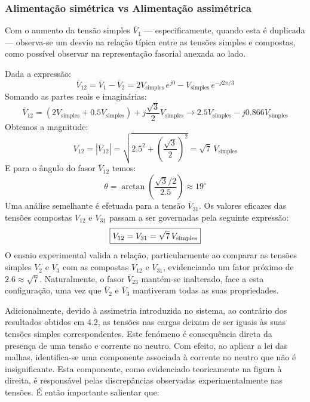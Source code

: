 \clearpage
\subsubsection*{Alimentação simétrica vs Alimentação assimétrica}

Com o aumento da tensão simples $\overline{V}_{1}$ --– especificamente, quando esta é duplicada --- observa-se um desvio na relação típica entre as tensões simples e compostas, como possível observar na representação fasorial anexada ao lado. 

\noindent Dada a expressão:
$$
    \overline{V}_{12} = \overline{V}_{1} - \overline{V}_{2} = 2V_\text{simples}\, e^{j0} - V_\text{simples}\, e^{-j2\pi/3} 
$$
\noindent Somando as partes reais e imaginárias:
$$
	\overline{V}_{12} = (2V_\text{simples} + 0.5V_\text{simples}) + j\frac{\sqrt{3}}{2} V_\text{simples} \rightarrow \boxed{2.5V_\text{simples} - j0.866V_\text{simples}}
$$
\noindent Obtemos a magnitude:
$$
	V_{12} = |\overline{V}_{12}| = \sqrt{2.5^2 + \left(\frac{\sqrt{3}}{2}\right)^2} = \sqrt{7}\, V_\text{simples}
$$
\noindent E para o ângulo do fasor $\overline{V}_{12}$ temos:
$$
	\theta = \arctan\left(\frac{\sqrt{3}/2}{2.5}\right) \approx 19^{\circ}
$$
\noindent Uma análise semelhante é efetuada para a tensão $\overline{V}_{31}$. Os valores eficazes das tensões compostas $V_{12}$ e $V_{31}$ passam a ser governadas pela seguinte expressão:
$$
    \boxed{%
        V_{12} = V_{31} = \sqrt{7}\, V_\text{simples}
    }
$$
\noindent O ensaio experimental valida a relação, particularmente ao comparar as tensões simples $V_2$ e $V_3$ com as compostas $V_{12}$ e $V_{31}$, evidenciando um fator próximo de $2.6 \approx \sqrt{7}$. Naturalmente, o fasor $\overline{V}_{23}$ mantém-se inalterado, face a esta configuração, uma vez que $\overline{V}_2$ e $\overline{V}_3$ mantiveram todas as suas propriedades.

\noindent Adicionalmente, devido à assimetria introduzida no sistema, ao contrário dos resultados obtidos em 4.2, as tensões nas cargas deixam de ser iguais às suas tensões simples correspondentes. Este fenómeno é consequência direta da presença de uma tensão e corrente no neutro. Com efeito, ao aplicar a lei das malhas, identifica-se uma componente associada à corrente no neutro que não é insignificante. Esta componente, como evidenciado teoricamente na figura à direita, é responsável pelas discrepâncias observadas experimentalmente nas tensões. É então importante salientar que:

